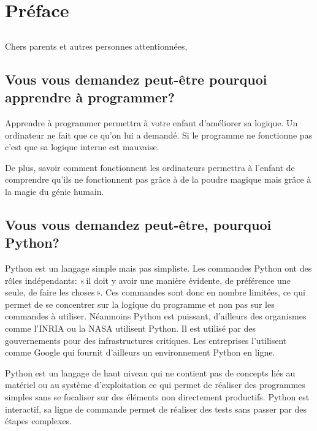 



\markboth{}{}

\chapter{Préface}
\section*{}

Chers parents et autres personnes attentionnées,\\

\section*{Vous vous demandez peut-être pourquoi apprendre à programmer?}
Apprendre à programmer permettra à votre enfant d'améliorer sa logique. Un ordinateur ne fait que ce qu'on lui a demandé. Si le programme ne fonctionne pas c'est que sa logique interne est mauvaise. 

De plus, savoir comment fonctionnent les ordinateurs permettra à l'enfant de compren\-dre qu'ils ne fonctionnent pas grâce à de la poudre magique mais grâce à la magie du génie humain.


\section*{Vous vous demandez peut-être, pourquoi Python?}
Python est un langage simple mais pas simpliste. Les commandes Python ont des rôles indépendants: « il doit y avoir une manière évidente, de préférence une seule, de faire les choses ». Ces commandes sont donc en nombre limitées, ce qui permet de se concentrer sur la logique du programme et non pas sur les commandes à utiliser. 
Néanmoins Python est puissant, d'ailleurs des organismes comme l'INRIA ou la NASA utilisent Python. Il est utilisé par des gouvernements pour des infrastructures critiques. Les entreprises l'utilisent comme Google qui fournit d'ailleurs un environnement Python en ligne.

Python est un langage de haut niveau qui ne contient pas de concepts liés au matériel ou au système d'exploitation ce qui permet de réaliser des programmes simples sans se focaliser sur des éléments non directement productifs. Python est interactif, sa ligne de commande permet de réaliser des tests sans passer par des étapes complexes.

